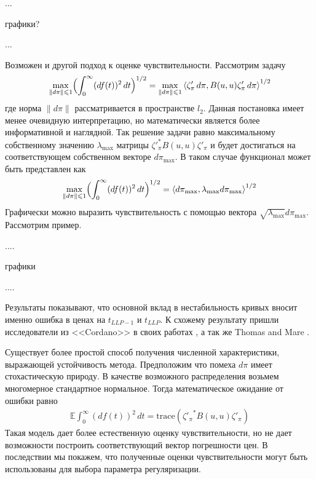 \documentclass[10pt]{article}
\theoremstyle{definition}
\theoremstyle{remark}
\theoremstyle{plain}
\newcommand{\scalar}[2]{\left<#1,#2\right>}
\begin{document}
...

графики?

...

Возможен и другой подход к оценке чувствительности. Рассмотрим задачу
\begin{align}
\max\limits_{\|d\pi\| \leqslant 1} \Bigl(\int_0^{\infty}(df(t))^2\,dt\Bigr)^{1/2}
= \max\limits_{\|d\pi\| \leqslant 1} \scalar{\zeta'_\pi\,d\pi}{B(u,u)\zeta'_{\pi}\,d\pi}^{1/2}
\end{align}
где норма $\|d\pi\|$ рассматривается в пространстве $l_2$. Данная постановка имеет менее очевидную интерпретацию, но математически является более информативной и наглядной. Так решение задачи равно максимальному собственному значению $\lambda_{\max}$ матрицы $\zeta'^*_{\pi}B(u,u)\zeta'_{\pi}$ и будет достигаться на соответствующем собственном векторе $d\pi_{\max}$. В таком случае функционал может быть представлен как 
\begin{align}
\max\limits_{\|d\pi\| \leqslant 1} \Bigl(\int_0^{\infty}(df(t))^2\,dt\Bigr)^{1/2}
= \scalar{d\pi_{\max}}{\lambda_{\max}d\pi_{\max}}^{1/2}
\end{align}
Графически можно выразить чувствительность с помощью вектора $\sqrt{\lambda_{\max}}d\pi_{\max}$. Рассмотрим пример.

....

графики

....

Результаты показывают, что основной вклад в нестабильность кривых вносит именно ошибка в ценах на $t_{LLP-1}$ и $t_{LLP}$. К схожему результату пришли исследователи из <<Cordano>> в своих работах \cite{Cordano??}, а так же Thomas and Mare \cite{Thomas&Mare}. 

Существует более простой способ получения численной характеристики, выражающей устойчивость метода. Предположим что помеха $d\pi$ имеет стохастическую природу. В качестве возможного распределения возьмем многомерное стандартное нормальное. Тогда математическое ожидание от ошибки равно 
\begin{align}
\mathbb{E}\int_0^{\infty}(df(t))^2\,dt = \mathrm{trace}\left({\zeta'_{\pi}}^* B(u,u) \zeta'_{\pi}\right) \label{sensitivity}
\end{align}
Такая модель дает более естественную оценку чувствительности, но не дает возможности построить соответствующий вектор погрешности цен. В последствии мы покажем, что полученные оценки чувствительности могут быть использованы для выбора параметра регуляризации. 
\end{document}
